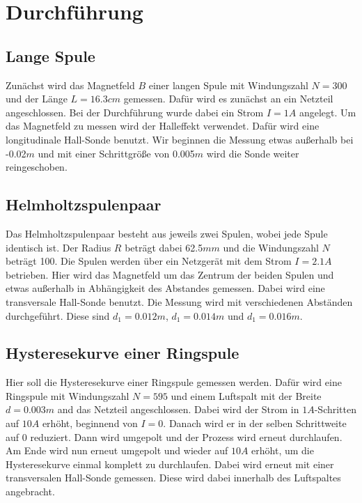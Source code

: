 \section{Durchführung}
\label{sec:Durchführung}

\subsection{Lange Spule}
\label{sec:LangeSpule}

Zunächst wird das Magnetfeld $B$ einer langen Spule mit Windungszahl $N = 300$ und der Länge $L = 16.3 cm$ gemessen.
Dafür wird es zunächst an ein Netzteil angeschlossen. Bei der Durchführung wurde dabei ein Strom $I = 1A$ angelegt.
Um das Magnetfeld zu messen wird der Halleffekt verwendet.
Dafür wird eine longitudinale Hall-Sonde benutzt.
Wir beginnen die Messung etwas außerhalb bei -0.02$m$ und mit einer Schrittgröße von 0.005$m$ wird die Sonde weiter reingeschoben.

\subsection{Helmholtzspulenpaar}
\label{sec:Spulenpaar}

Das Helmholtzspulenpaar besteht aus jeweils zwei Spulen, wobei jede Spule identisch ist.
Der Radius $R$ beträgt dabei 62.5$mm$ und die Windungszahl $N$ beträgt 100.
Die Spulen werden über ein Netzgerät mit dem Strom $I = 2.1A$ betrieben. 
Hier wird das Magnetfeld um das Zentrum der beiden Spulen und etwas außerhalb in Abhängigkeit des Abstandes gemessen.
Dabei wird eine transversale Hall-Sonde benutzt.
Die Messung wird mit verschiedenen Abständen durchgeführt.
Diese sind $d_{1} = 0.012m$, $d_{1} = 0.014m$ und $d_{1} = 0.016m$.

\subsection{Hysteresekurve einer Ringspule}
\label{sec:Hysteresekurve}

Hier soll die Hysteresekurve einer Ringspule gemessen werden.
Dafür wird eine Ringspule mit Windungszahl $N = 595$ und einem Luftspalt mit der Breite $d = 0.003m$ and das Netzteil angeschlossen.
Dabei wird der Strom in $1A$-Schritten auf $10A$ erhöht, beginnend von $I = 0$.
Danach wird er in der selben Schrittweite auf 0 reduziert.
Dann wird umgepolt und der Prozess wird erneut durchlaufen.
Am Ende wird nun erneut umgepolt und wieder auf $10A$ erhöht, um die Hysteresekurve einmal komplett zu durchlaufen.
Dabei wird erneut mit einer transversalen Hall-Sonde gemessen.
Diese wird dabei innerhalb des Luftspaltes angebracht.